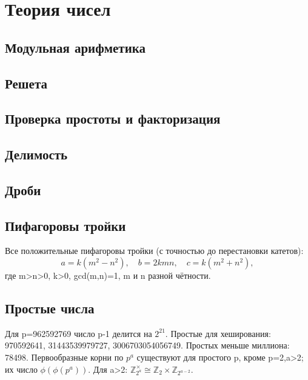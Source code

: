 \chapter{Теория чисел}

\section{Модульная арифметика}



\section{Решета}

\section{Проверка простоты и факторизация}

\section{Делимость}



\section{Дроби}

\section{Пифагоровы тройки}

Все положительные пифагоровы тройки (с точностью до перестановки катетов):
\[a=k(m^2-n^2),\quad b=2kmn,\quad c=k(m^2+n^2),\]
где m>n>0, k>0, gcd(m,n)=1, m и n разной чётности.
\section{Простые числа}
Для p=962592769 число p-1 делится на $2^{21}$.
Простые для хеширования: 970592641, 31443539979727,
3006703054056749. Простых меньше миллиона: 78498.
Первообразные корни по $p^a$ существуют для простого p,
кроме p=2,a>2; их число $\phi(\phi(p^a))$.
Для a>2: $\mathbb Z_{2^a}^{\times}\cong\mathbb Z_2\times\mathbb Z_{2^{a-2}}$.
